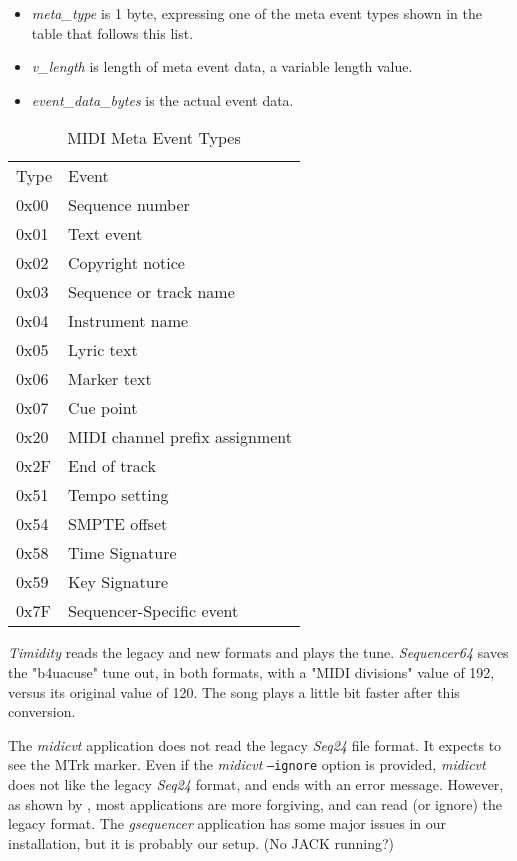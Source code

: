    \begin{itemize}
      \item \textsl{meta\_type} is 1 byte, expressing one of the meta event
         types shown in the table that follows this list.
      \item \textsl{v\_length} is length of meta event data, a variable
         length value.
      \item \textsl{event\_data\_bytes} is the actual event data.
   \end{itemize}

   \begin{table}
      \centering
      \caption{MIDI Meta Event Types}
      \label{table:midi_meta_event_types}
      \begin{tabular}{l l}
         Type	& Event \\
         0x00	& Sequence number \\
         0x01	& Text event \\
         0x02	& Copyright notice \\
         0x03	& Sequence or track name \\
         0x04	& Instrument name \\
         0x05	& Lyric text \\
         0x06	& Marker text \\
         0x07	& Cue point \\
         0x20	& MIDI channel prefix assignment \\
         0x2F	& End of track \\
         0x51	& Tempo setting \\
         0x54	& SMPTE offset \\
         0x58	& Time Signature \\
         0x59	& Key Signature \\
         0x7F	& Sequencer-Specific event \\
      \end{tabular}
   \end{table}

   \textsl{Timidity} reads the legacy and new formats and plays the tune.
   \textsl{Sequencer64}  saves the "b4uacuse" tune out, in both formats,
   with a "MIDI divisions" value of 192, versus its original value of 120.
   The song plays a little bit faster after this conversion.

   The \textsl{midicvt} application does not read the legacy \textsl{Seq24}
   file format.  It
   expects to see the MTrk marker.  Even if the \textsl{midicvt}
   \texttt{--ignore} option is provided,
   \textsl{midicvt} does not like the legacy \textsl{Seq24} format, and ends
   with an error message.
   However, as shown by ,
   most applications are more
   forgiving, and can read (or ignore) the legacy format.  The
   \textsl{gsequencer} application has some major issues in our
   installation, but it is probably our setup.  (No JACK running?)

